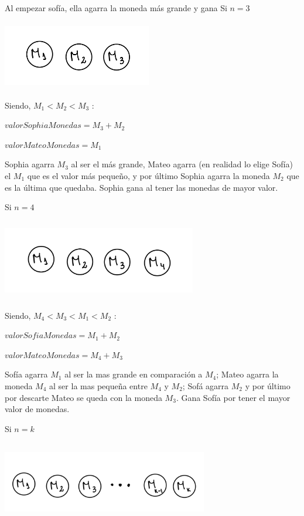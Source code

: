 Al empezar sofía, ella agarra la moneda más grande y gana
\vskip1cm
Si $n=3$

\includegraphics[width=6.5cm, height=3cm]{images/IMG_1627.jpg}

Siendo, $M_{1}<M_{2}<M_{3}$ : 


$valorSophiaMonedas=M_{3}+M_{2}$

$valorMateoMonedas=M_{1}$

Sophia agarra $M_{3}$ al ser el más grande, Mateo agarra (en realidad lo elige Sofía) el $M_{1}$ que es el valor
más pequeño, y por último Sophia agarra la moneda $M_{2}$ que es la última que quedaba. 
Sophia gana al tener las monedas de mayor valor.

\vskip1cm
Si $n=4$

\includegraphics[width=8.5cm, height=3.5cm]{images/IMG_1628.jpg}

Siendo, $M_{4}<M_{3}<M_{1}<M_{2}$ : 

$valorSofiaMonedas=M_{1}+M_{2}$

$valorMateoMonedas=M_{4}+M_{3}$

Sofía agarra $M_{1}$ al ser la mas grande en comparación a $M_{4}$; Mateo agarra la moneda $M_{4}$ al ser la mas 
pequeña entre $M_{4}$ y $M_{2}$; Sofá agarra $M_{2}$ y por último por descarte Mateo se queda con la moneda $M_{3}$.
Gana Sofía por tener el mayor valor de monedas.

\vskip1cm
Si $n=k$

\includegraphics[width=9cm, height=3.5cm]{images/IMG_1629.jpg}

